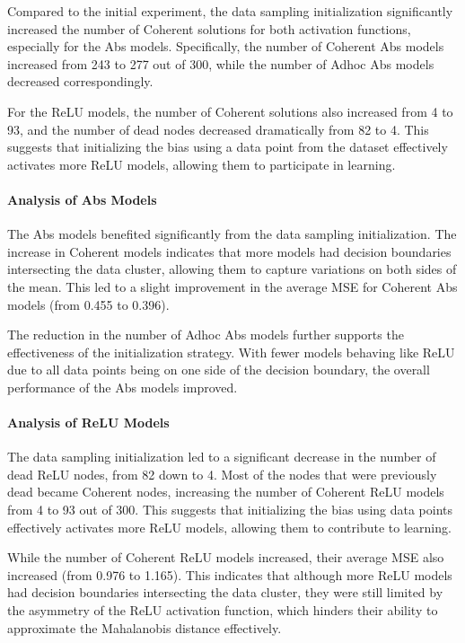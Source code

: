 Compared to the initial experiment, the data sampling initialization significantly increased the number of Coherent solutions for both activation functions, especially for the Abs models. Specifically, the number of Coherent Abs models increased from 243 to 277 out of 300, while the number of Adhoc Abs models decreased correspondingly.

For the ReLU models, the number of Coherent solutions also increased from 4 to 93, and the number of dead nodes decreased dramatically from 82 to 4. This suggests that initializing the bias using a data point from the dataset effectively activates more ReLU models, allowing them to participate in learning.

\paragraph{Analysis of Abs Models}

The Abs models benefited significantly from the data sampling initialization. The increase in Coherent models indicates that more models had decision boundaries intersecting the data cluster, allowing them to capture variations on both sides of the mean. This led to a slight improvement in the average MSE for Coherent Abs models (from 0.455 to 0.396).

The reduction in the number of Adhoc Abs models further supports the effectiveness of the initialization strategy. With fewer models behaving like ReLU due to all data points being on one side of the decision boundary, the overall performance of the Abs models improved.

\paragraph{Analysis of ReLU Models}

The data sampling initialization led to a significant decrease in the number of dead ReLU nodes, from 82 down to 4. Most of the nodes that were previously dead became Coherent nodes, increasing the number of Coherent ReLU models from 4 to 93 out of 300. This suggests that initializing the bias using data points effectively activates more ReLU models, allowing them to contribute to learning.

While the number of Coherent ReLU models increased, their average MSE also increased (from 0.976 to 1.165). This indicates that although more ReLU models had decision boundaries intersecting the data cluster, they were still limited by the asymmetry of the ReLU activation function, which hinders their ability to approximate the Mahalanobis distance effectively.

